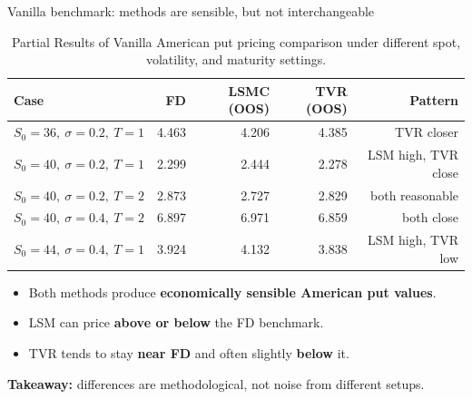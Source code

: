 \documentclass[
  11pt,
  ignorenonframetext,
  aspectratio=169,
]{beamer}
\providecommand{\tightlist}{%
  \setlength{\itemsep}{0pt}\setlength{\parskip}{0pt}}
\begin{document}
\begin{frame}{Vanilla benchmark: methods are sensible, but not
interchangeable}
\label{vanilla-benchmark-methods-are-sensible-but-not-interchangeable}
\begin{table}
\small
\centering
\begin{tabular}{lrrrr}
\toprule
Case & FD & LSMC (OOS) & TVR (OOS) & Pattern \\
\midrule
$S_0=36,\ \sigma=0.2,\ T=1$ & 4.463 & 4.206 & 4.385 & TVR closer \\
$S_0=40,\ \sigma=0.2,\ T=1$ & 2.299 & 2.444 & 2.278 & LSM high, TVR close \\
$S_0=40,\ \sigma=0.2,\ T=2$ & 2.873 & 2.727 & 2.829 & both reasonable \\
$S_0=40,\ \sigma=0.4,\ T=2$ & 6.897 & 6.971 & 6.859 & both close \\
$S_0=44,\ \sigma=0.4,\ T=1$ & 3.924 & 4.132 & 3.838 & LSM high, TVR low \\
\bottomrule
\end{tabular}%
\caption{Partial Results of Vanilla American put pricing comparison under different spot, volatility, and maturity settings.}
\end{table}

\begin{itemize}
\tightlist
\item
  Both methods produce \textbf{economically sensible American put
  values}.
\item
  LSM can price \textbf{above or below} the FD benchmark.
\item
  TVR tends to stay \textbf{near FD} and often slightly \textbf{below}
  it.
\end{itemize}

\textbf{Takeaway:} differences are methodological, not noise from
different setups.
\end{frame}
\end{document}
